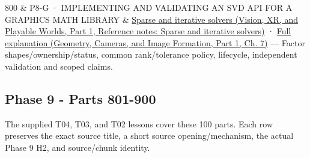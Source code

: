 {\begin{longtable}[]
800 & P8-G · IMPLEMENTING AND VALIDATING AN SVD API FOR A GRAPHICS MATH LIBRARY & \href{../07-Vision-XR-and-Playable-Worlds-P01/main.pdf\#nameddest=appendix-67c87a3d9e94}{Sparse and iterative solvers (Vision, XR, and Playable Worlds, Part 1, Reference notes: Sparse and iterative solvers)} · \href{../03-Geometry-Cameras-and-Image-Formation-P01/main.pdf\#nameddest=02-foundations-ii-ch038-an-svd-api-begins-with-shapes-and-guarantees}{Full explanation (Geometry, Cameras, and Image Formation, Part 1, Ch. 7)} --- Factor shapes/ownership/status, common rank/tolerance policy, lifecycle, independent validation and scoped claims. \\
\end{longtable}
}

\subsection{Phase 9 - Parts 801-900}\label{appendix-fd090d982a15-phase-9---parts-801-900}

\hypertarget{appendix-fd090d982a15-phase-9---parts-801-900}{}

The supplied T04, T03, and T02 lessons cover these 100 parts. Each row preserves the exact source title, a short source opening/mechanism, the actual Phase 9 H2, and source/chunk identity.

